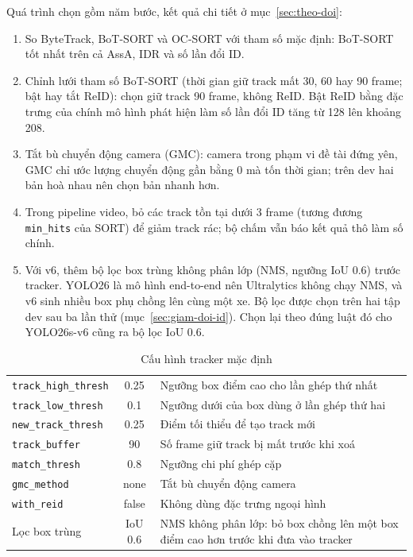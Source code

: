 Quá trình chọn gồm năm bước, kết quả chi tiết ở mục~\ref{sec:theo-doi}:
\begin{enumerate}
  \item So ByteTrack, BoT-SORT và OC-SORT với tham số mặc định: BoT-SORT tốt nhất trên cả AssA, IDR và số lần đổi ID.
  \item Chỉnh lưới tham số BoT-SORT (thời gian giữ track mất 30, 60 hay 90 frame; bật hay tắt ReID): chọn giữ track 90
        frame, không ReID. Bật ReID bằng đặc trưng của chính mô hình phát hiện làm số lần đổi ID tăng từ 128 lên khoảng
        208.
  \item Tắt bù chuyển động camera (GMC): camera trong phạm vi đề tài đứng yên, GMC chỉ ước lượng chuyển động gần bằng 0
        mà tốn thời gian; trên dev hai bản hoà nhau nên chọn bản nhanh hơn.
  \item Trong pipeline video, bỏ các track tồn tại dưới 3 frame (tương đương \texttt{min\_hits} của SORT) để giảm track
        rác; bộ chấm vẫn báo kết quả thô làm số chính.
  \item Với v6, thêm bộ lọc box trùng không phân lớp (NMS, ngưỡng IoU 0.6) trước tracker. YOLO26 là mô hình end-to-end
        nên Ultralytics không chạy NMS, và v6 sinh nhiều box phụ chồng lên cùng một xe. Bộ lọc được chọn trên hai tập
        dev sau ba lần thử (mục~\ref{sec:giam-doi-id}). Chọn lại theo đúng luật đó cho YOLO26s-v6 cũng ra bộ lọc IoU 0.6.
\end{enumerate}

\begin{table}[H]
  \centering
  \caption{Cấu hình tracker mặc định}
  \label{tab:tracker-config}
  \small
  \begin{tabularx}{\linewidth}{P{4.2cm}cL}
    \toprule
     &  &  \\ \midrule
    \texttt{track\_high\_thresh} & 0.25 & Ngưỡng box điểm cao cho lần ghép thứ nhất \\ \rowsep
    \texttt{track\_low\_thresh} & 0.1 & Ngưỡng dưới của box dùng ở lần ghép thứ hai \\ \rowsep
    \texttt{new\_track\_thresh} & 0.25 & Điểm tối thiểu để tạo track mới \\ \rowsep
    \texttt{track\_buffer} & 90 & Số frame giữ track bị mất trước khi xoá \\ \rowsep
    \texttt{match\_thresh} & 0.8 & Ngưỡng chi phí ghép cặp \\ \rowsep
    \texttt{gmc\_method} & none & Tắt bù chuyển động camera \\ \rowsep
    \texttt{with\_reid} & false & Không dùng đặc trưng ngoại hình \\ \rowsep
    Lọc box trùng & IoU 0.6 & NMS không phân lớp: bỏ box chồng lên một box điểm cao hơn trước khi đưa vào tracker
      \\ \bottomrule
  \end{tabularx}
\end{table}

